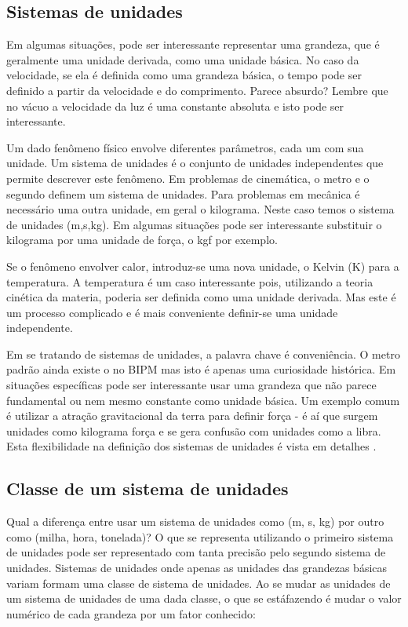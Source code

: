 \subsection{Sistemas de unidades}

Em algumas situações, pode ser interessante representar uma grandeza, que é geralmente uma unidade derivada, como uma unidade básica. No caso da velocidade, se ela é definida como uma grandeza básica, o tempo pode ser definido a partir da velocidade e do comprimento. Parece absurdo? Lembre que no vácuo a velocidade da luz é uma constante absoluta e isto pode ser interessante.

Um dado fenômeno físico envolve diferentes parâmetros, cada um com sua unidade. Um sistema de unidades é o conjunto de unidades independentes que permite descrever este fenômeno. Em problemas de cinemática, o metro e o segundo definem um sistema de unidades. Para problemas em mecânica é necessário uma outra unidade, em geral o kilograma. Neste caso temos o sistema de unidades (m,s,kg). Em algumas situações pode ser interessante substituir o kilograma por uma unidade de força, o kgf por exemplo.

Se o fenômeno envolver calor, introduz-se uma nova unidade, o Kelvin (K) para a temperatura. A temperatura é um caso interessante pois, utilizando a teoria cinética da materia, poderia ser definida como uma unidade derivada. Mas este é um processo complicado e é mais conveniente definir-se uma unidade independente.

Em se tratando de sistemas de unidades, a palavra chave é conveniência. O metro padrão ainda existe o no BIPM mas isto é apenas uma curiosidade histórica. Em situações específicas pode ser interessante usar uma grandeza que não parece fundamental ou nem mesmo constante como unidade básica. Um exemplo comum é utilizar a atração gravitacional da terra para definir força - é aí que surgem unidades como kilograma força e se gera confusão com unidades como a libra. Esta flexibilidade na definição dos sistemas de unidades é vista em detalhes .

\subsection{Classe de um sistema de unidades}

Qual a diferença entre usar um sistema de unidades como (m, s, kg) por outro como (milha, hora, tonelada)? O que se representa utilizando o primeiro sistema de unidades pode ser representado com tanta precisão pelo segundo sistema de unidades. Sistemas de unidades onde apenas as unidades das grandezas básicas variam formam uma classe de sistema de unidades. Ao se mudar as unidades de um sistema de unidades de uma dada classe, o que se estáfazendo é mudar o valor numérico de cada grandeza por um fator conhecido:

